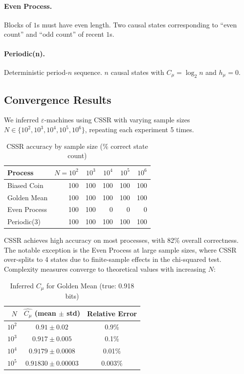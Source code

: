\documentclass[11pt,twocolumn]{article}
\theoremstyle{plain}
\theoremstyle{definition}
\theoremstyle{remark}
\newcommand{\eps}{\varepsilon}
\newcommand{\eM}{$\eps$-machine}
\newcommand{\Cmu}{C_\mu}
\newcommand{\hmu}{h_\mu}
\begin{document}
\paragraph{Even Process.} Blocks of $1$s must have even length. Two causal states corresponding to ``even count'' and ``odd count'' of recent $1$s.

\paragraph{Periodic(n).} Deterministic period-$n$ sequence. $n$ causal states with $\Cmu = \log_2 n$ and $\hmu = 0$.

\subsection{Convergence Results}

We inferred \eM s using CSSR with varying sample sizes $N \in \{10^2, 10^3, 10^4, 10^5, 10^6\}$, repeating each experiment 5 times.

\begin{table}[h]
\centering
\caption{CSSR accuracy by sample size (\% correct state count)}
\label{tab:convergence}
\small
\begin{tabular}{lrrrrr}
\toprule
Process & $N=10^2$ & $10^3$ & $10^4$ & $10^5$ & $10^6$ \\
\midrule
Biased Coin & 100 & 100 & 100 & 100 & 100 \\
Golden Mean & 100 & 100 & 100 & 100 & 100 \\
Even Process & 100 & 100 & 0 & 0 & 0 \\
Periodic(3) & 100 & 100 & 100 & 100 & 100 \\
\bottomrule
\end{tabular}
\end{table}

CSSR achieves high accuracy on most processes, with 82\% overall correctness. The notable exception is the Even Process at large sample sizes, where CSSR over-splits to 4 states due to finite-sample effects in the chi-squared test. Complexity measures converge to theoretical values with increasing $N$:

\begin{table}[h]
\centering
\caption{Inferred $\Cmu$ for Golden Mean (true: 0.918 bits)}
\label{tab:cmu-convergence}
\small
\begin{tabular}{rcc}
\toprule
$N$ & $\hat{\Cmu}$ (mean $\pm$ std) & Relative Error \\
\midrule
$10^2$ & $0.91 \pm 0.02$ & 0.9\% \\
$10^3$ & $0.917 \pm 0.005$ & 0.1\% \\
$10^4$ & $0.9179 \pm 0.0008$ & 0.01\% \\
$10^5$ & $0.91830 \pm 0.00003$ & 0.003\% \\
\bottomrule
\end{tabular}
\end{table}
\end{document}
